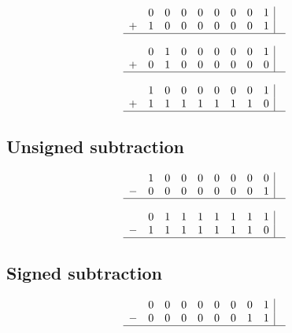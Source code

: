 \documentclass{article}
\begin{document}
$$
\begin{array}{ccccccccc|c}
  & 0 & 0 & 0 & 0 & 0 & 0 & 0 & 1 & \textcolor{blue}{ } \\
+ & 1 & 0 & 0 & 0 & 0 & 0 & 0 & 1 & \textcolor{blue}{ } \\
\hline
\end{array}
$$

\bigskip


$$
\begin{array}{ccccccccc|c}
  & 0 & 1 & 0 & 0 & 0 & 0 & 0 & 1 & \textcolor{blue}{ } \\
+ & 0 & 1 & 0 & 0 & 0 & 0 & 0 & 0 & \textcolor{blue}{ } \\
\hline
\end{array}
$$

\bigskip


$$
\begin{array}{ccccccccc|c}
  & 1 & 0 & 0 & 0 & 0 & 0 & 0 & 1 & \textcolor{blue}{ } \\
+ & 1 & 1 & 1 & 1 & 1 & 1 & 1 & 0 & \textcolor{blue}{ } \\
\hline
\end{array}
$$

\bigskip

\subsection{Unsigned subtraction}

$$
\begin{array}{ccccccccc|c}
  & 1 & 0 & 0 & 0 & 0 & 0 & 0 & 0 & \textcolor{blue}{ } \\
- & 0 & 0 & 0 & 0 & 0 & 0 & 0 & 1 & \textcolor{blue}{ } \\
\hline
\end{array}
$$

\bigskip

$$
\begin{array}{ccccccccc|c}
  & 0 & 1 & 1 & 1 & 1 & 1 & 1 & 1 & \textcolor{blue}{ } \\
- & 1 & 1 & 1 & 1 & 1 & 1 & 1 & 0 & \textcolor{blue}{ } \\
\hline
\end{array}
$$

\bigskip

\subsection{Signed subtraction}

$$
\begin{array}{ccccccccc|c}
  & 0 & 0 & 0 & 0 & 0 & 0 & 0 & 1 & \textcolor{blue}{ } \\
- & 0 & 0 & 0 & 0 & 0 & 0 & 1 & 1 & \textcolor{blue}{ } \\
\hline
\end{array}
$$
\end{document}
